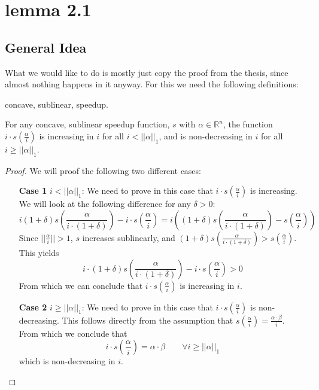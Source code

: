 \chapter{lemma 2.1}\label{ch_lemma2_1}

\section{General Idea}
What we would like to do is mostly just copy the proof from the thesis, since almost
nothing happens in it anyway. For this we need the following definitions:
\begin{enumerate}
    concave, sublinear, speedup.
\end{enumerate}

\begin{lemma}\label{lem:lemma2.1}
  For any concave, sublinear speedup function, $s$ with $\alpha \in \mathbb{R}^n$,
  the function $i\cdot s(\frac{\alpha}{i})$ is increasing in $i$ for all $i<||\alpha||_1$,
  and is non-decreasing in $i$ for all $i\geq ||\alpha||_1$.
\end{lemma}
\begin{proof}
  We will proof the following two different cases:
  \begin{enumerate}
      \item[\textbf{Case 1}]  $i < ||\alpha||_1$: We need to prove in this case that $i\cdot s(\frac{\alpha}{i})$ is increasing. We will look at the following difference for any $\delta > 0$:
        $$i (1+\delta) s \left(\frac{\alpha}{i\cdot(1+\delta)} \right) - i \cdot s (\frac{\alpha}{i}) = i \left((1+\delta) s \left(\frac{\alpha}{i\cdot(1+\delta)} \right) - s (\frac{\alpha}{i})\right)$$
      Since $||\frac{\alpha}{i}|| > 1$, $s$ increases sublinearly, and $(1+\delta)s\left(\frac{\alpha}{i \cdot (1+\delta)}\right) > s(\frac{\alpha}{i})$. This yields
        $$i \cdot(1+\delta)s\left(\frac{\alpha}{i\cdot(1+\delta)} \right) - i \cdot s\left(\frac{\alpha}{i}\right) > 0$$
      From which we can conclude that $i \cdot s(\frac{\alpha}{i})$ is increasing in $i$.
      \item[\textbf{Case 2}] $i \geq ||\alpha||_1$: We need to prove in this case that $i\cdot s(\frac{\alpha}{i})$ is non-decreasing. This follows directly from the assumption that $s\left(\frac{\alpha}{i}\right) = \frac{\alpha \cdot \beta}{i}$. From which we conclude that $$i\cdot s \left(\frac{\alpha}{i}\right) = \alpha \cdot \beta \qquad \forall i \geq ||\alpha||_1$$
      which is non-decreasing in $i$.
  \end{enumerate}
\end{proof}
